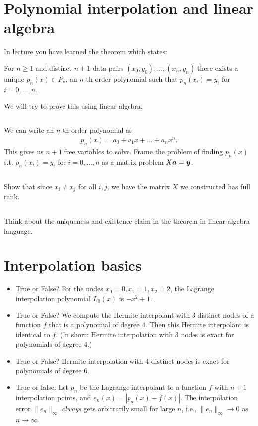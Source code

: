\documentclass[11pt,letterpaper]{article}
\begin{document}
 

\section{Polynomial interpolation and linear algebra}
In lecture you have learned the theorem which states:

For $n\geq 1$ and distinct $n+1$ data pairs $(x_0,y_0),\dots,(x_n,y_n)$ there exists a unique $p_n(x)\in P_n$, an $n$-th order polynomial such that $p_n(x_i) = y_i$ for $i = 0,\dots,n$. 

We will try to prove this using linear algebra.

\subsection{}
We can write an $n$-th order polynomial as
\begin{align*}
    p_n(x) = a_0 + a_1x + \dots + a_nx^n.
\end{align*}
This gives us $n+1$ free variables to solve. Frame the problem of finding $p_n(x)$ s.t. $p_n(x_i) = y_i$ for $i = 0,\dots,n$ as a matrix problem $X\boldsymbol{a} = \boldsymbol{y}$.

\subsection{}
Show that since $x_i\neq x_j$ for all $i,j$, we have the matrix $X$ we constructed has full rank. 

\subsection{}
Think about the uniqueness and existence claim in the theorem in linear algebra language. 

\section{Interpolation basics}
\begin{itemize}
\item True or False? For the nodes $x_0=0, x_1=1, x_2= 2$, the
  Lagrange interpolation polynomial $L_0(x)$ is $-x^2 + 1$.
\item True or False? We compute the Hermite interpolant with 3 distinct nodes of
  a function $f$ that is a polynomial of degree $4$. Then this
  Hermite interpolant is identical to $f$. (In short: Hermite
  interpolation with 3 nodes is exact for polynomials of degree 4.)
\item True or False? Hermite interpolation with 4 distinct nodes is exact for
  polynomials of degree 6.
\item True or false: Let $p_n$ be the Lagrange interpolant to a
function $f$ with $n+1$ interpolation points, and $e_n(x) =
|p_n(x) - f(x)|$.  The interpolation error $\|e_n\|_\infty$ {\em
always} gets arbitrarily small for large $n$, i.e.,
$\|e_n\|_\infty \rightarrow 0$ as $n \rightarrow \infty$.
\end{itemize}
\end{document}
